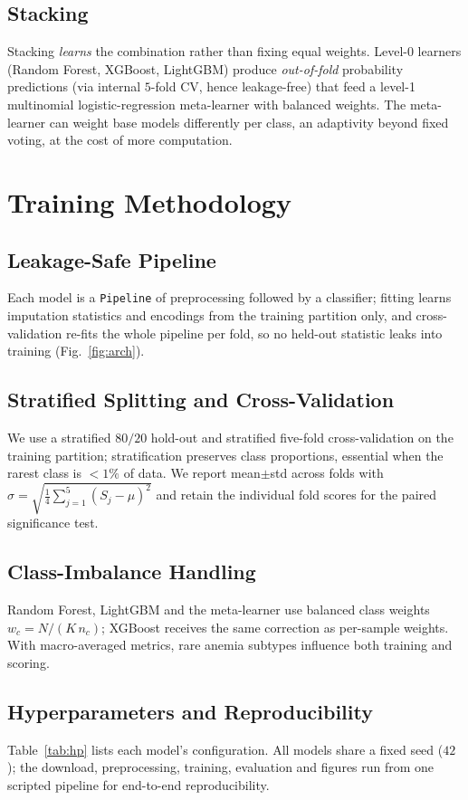 \documentclass[conference]{IEEEtran}
\begin{document}
\subsection{Stacking}
Stacking \emph{learns} the combination rather than fixing equal weights. Level-0
learners (Random Forest, XGBoost, LightGBM) produce \emph{out-of-fold} probability
predictions (via internal $5$-fold CV, hence leakage-free) that feed a level-1
multinomial logistic-regression meta-learner with balanced weights. The
meta-learner can weight base models differently per class, an adaptivity beyond
fixed voting, at the cost of more computation.

\section{Training Methodology}
\subsection{Leakage-Safe Pipeline}
\label{sec:leak}
Each model is a \texttt{Pipeline} of preprocessing followed by a classifier;
fitting learns imputation statistics and encodings from the training partition
only, and cross-validation re-fits the whole pipeline per fold, so no held-out
statistic leaks into training (Fig.~\ref{fig:arch}).

\subsection{Stratified Splitting and Cross-Validation}
We use a stratified $80/20$ hold-out and stratified five-fold cross-validation on
the training partition; stratification preserves class proportions, essential when
the rarest class is ${<}1\%$ of data. We report mean$\pm$std across folds with
$\sigma=\sqrt{\tfrac14\sum_{j=1}^{5}(S_j-\mu)^2}$ and retain the individual fold
scores for the paired significance test.

\subsection{Class-Imbalance Handling}
\label{sec:imb}
Random Forest, LightGBM and the meta-learner use balanced class weights
$w_c=N/(K\,n_c)$; XGBoost receives the same correction as per-sample weights. With
macro-averaged metrics, rare anemia subtypes influence both training and scoring.

\subsection{Hyperparameters and Reproducibility}
Table~\ref{tab:hp} lists each model's configuration. All models share a fixed seed
($42$); the download, preprocessing, training, evaluation and figures run from one
scripted pipeline for end-to-end reproducibility.
\end{document}
